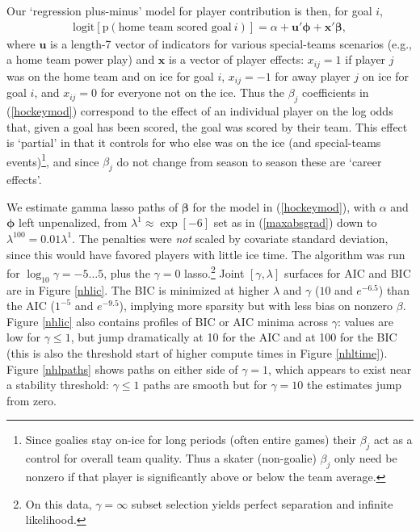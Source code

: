 \documentclass[12pt]{article}
\newcommand{\bs}[1]{\boldsymbol{#1}}
\newcommand{\mr}[1]{\mathrm{#1}}
\newcommand{\bm}[1]{\mathbf{#1}}
\begin{document}
Our `regression plus-minus' model for
player contribution is then, for goal $i$, 
\begin{align}\label{hockeymod}
\mr{logit}\left[\mr{p}(\text{home~team~scored~goal}~i)\right] = \alpha +
\bm{u}'\bs{\phi} + \bm{x}'\bs{\beta}, 
\end{align} 
where $\bm{u}$ is a length-7
vector of indicators for various special-teams scenarios (e.g., a home team
power play) and $\bm{x}$ is a vector of player effects: $x_{ij}=1$ if player
$j$ was on the home team and on ice for goal $i$, $x_{ij}=-1$ for away player
$j$ on ice for goal $i$, and $x_{ij}=0$ for everyone not on the ice.  
Thus the $\beta_j$ coefficients in (\ref{hockeymod}) correspond to the 
effect of an individual player on the log odds that, given a goal has been
scored, the goal was scored by their team.  This effect is `partial' in that
it controls for who else was on the ice (and special-teams
events)\footnote{Since goalies stay
on-ice for long periods (often entire games) their $\beta_j$  act as a
control for overall team quality.  Thus a skater (non-goalie) $\beta_j$ only need be
nonzero if that player is significantly above or below the team average.}, 
and since $\beta_j$ do not change from season
to season these are `career effects'.

We estimate gamma lasso paths of $\bs{\beta}$ for the model in
(\ref{hockeymod}), with  $\alpha$ and $\bs{\phi}$ left unpenalized, from  
$\lambda^1\approx \exp[-6]$ set as in (\ref{maxabsgrad}) down to $\lambda^{100} =
0.01\lambda^1$.  The penalties were {\it not} scaled by covariate standard
deviation, since this would have favored players with little ice time.  The
algorithm was run for $\log_{10}\gamma = -5 \ldots 5$, plus the $\gamma=0$
lasso.\footnote{On this data, $\gamma=\infty$ subset selection yields perfect separation and infinite likelihood.}
Joint $[\gamma,\lambda]$ surfaces
for AIC and BIC are in Figure \ref{nhlic}.  The BIC is minimized at higher $\lambda$
and $\gamma$ ($10$ and $e^{-6.5}$) than the AIC ($1^{-5}$ and $e^{-9.5}$), implying more sparsity but with less bias on
nonzero $\beta$.  Figure \ref{nhlic} also contains profiles
of BIC or AIC minima across $\gamma$: values are low for $\gamma \leq 1$,
but jump dramatically at 10 for the AIC and at 100 for the BIC (this is also the threshold start of higher compute times in Figure \ref{nhltime}).  
Figure \ref{nhlpaths}
shows paths on either side of $\gamma=1$, which appears to exist near a stability threshold: $\gamma\leq 1$ paths are smooth but for $\gamma=10$ the estimates jump from zero.
\end{document}
